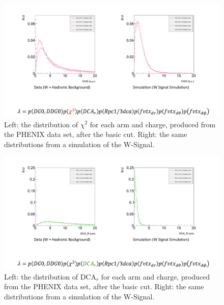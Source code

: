 \begin{figure}
  \centering
  \includegraphics[width=\linewidth,trim=4 4 4 4,clip]{./figures/pdf_chi2.png}
  \caption{
    Left: the distribution of $\chi^2$ for each arm and charge, produced from the
    PHENIX data set, after the basic cut. Right: the same distributions from a
    simulation of the W-Signal.
  }
  \label{fig:pdf_chi2}
\end{figure}

\begin{figure}
  \centering
  \includegraphics[width=\linewidth,trim=4 4 4 4,clip]{./figures/pdf_dcar.png}
  \caption{
    Left: the distribution of DCA$_r$ for each arm and charge, produced from the
    PHENIX data set, after the basic cut. Right: the same distributions from a
    simulation of the W-Signal.
  }
  \label{fig:pdf_dcar}
\end{figure}

